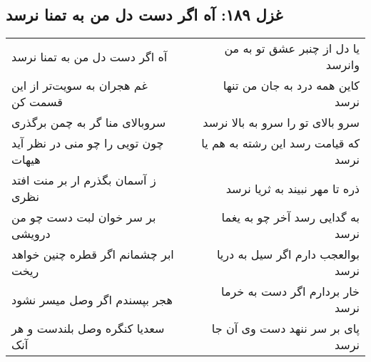 \begin{center}
\section*{غزل ۱۸۹: آه اگر دست دل من به تمنا نرسد}
\label{sec:189}
\begin{longtable}{l p{0.5cm} r}
آه اگر دست دل من به تمنا نرسد
&&
یا دل از چنبر عشق تو به من وانرسد
\\
غم هجران به سویت‌تر از این قسمت کن
&&
کاین همه درد به جان من تنها نرسد
\\
سروبالای منا گر به چمن برگذری
&&
سرو بالای تو را سرو به بالا نرسد
\\
چون تویی را چو منی در نظر آید هیهات
&&
که قیامت رسد این رشته به هم یا نرسد
\\
ز آسمان بگذرم ار بر منت افتد نظری
&&
ذره تا مهر نبیند به ثریا نرسد
\\
بر سر خوان لبت دست چو من درویشی
&&
به گدایی رسد آخر چو به یغما نرسد
\\
ابر چشمانم اگر قطره چنین خواهد ریخت
&&
بوالعجب دارم اگر سیل به دریا نرسد
\\
هجر بپسندم اگر وصل میسر نشود
&&
خار بردارم اگر دست به خرما نرسد
\\
سعدیا کنگره وصل بلندست و هر آنک
&&
پای بر سر ننهد دست وی آن جا نرسد
\\
\end{longtable}
\end{center}
